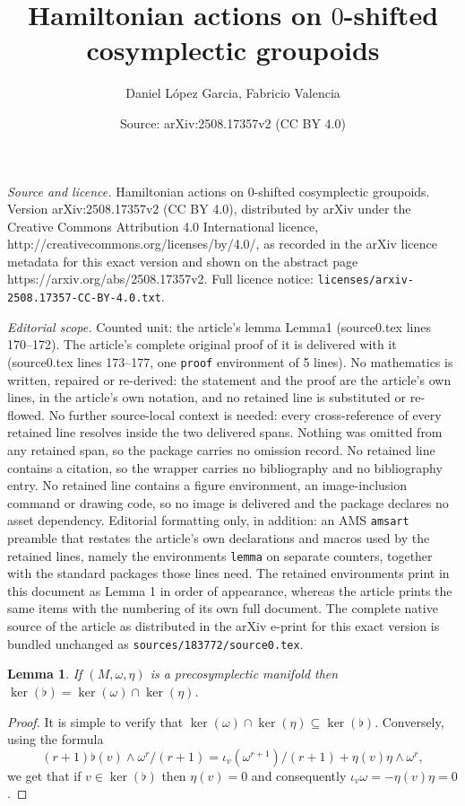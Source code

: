 \documentclass[10pt,a4paper]{amsart}
\title{Hamiltonian actions on $0$-shifted cosymplectic groupoids}
\author{Daniel L\'opez Garcia, Fabricio Valencia}
\date{Source: arXiv:2508.17357v2 (CC BY 4.0)}
\newtheorem{lemma}{Lemma}
\begin{document}
\maketitle

\noindent\emph{Source and licence.} Hamiltonian actions on $0$-shifted cosymplectic groupoids. Version arXiv:2508.17357v2 (CC BY 4.0), distributed by arXiv under the Creative Commons Attribution 4.0 International licence, http://creativecommons.org/licenses/by/4.0/, as recorded in the arXiv licence metadata for this exact version and shown on the abstract page https://arxiv.org/abs/2508.17357v2. Full licence notice: \texttt{licenses/arxiv-2508.17357-CC-BY-4.0.txt}.\par\smallskip

\noindent\textit{Editorial scope.} Counted unit: the article's lemma Lemma1 (source0.tex lines 170--172). The article's complete original proof of it is delivered with it (source0.tex lines 173--177, one \texttt{proof} environment of 5 lines). No mathematics is written, repaired or re-derived: the statement and the proof are the article's own lines, in the article's own notation, and no retained line is substituted or re-flowed.  No further source-local context is needed: every cross-reference of every retained line resolves inside the two delivered spans.  Nothing was omitted from any retained span, so the package carries no omission record.  No retained line contains a citation, so the wrapper carries no bibliography and no bibliography entry.  No retained line contains a figure environment, an image-inclusion command or drawing code, so no image is delivered and the package declares no asset dependency.  Editorial formatting only, in addition: an AMS \texttt{amsart} preamble that restates the article's own declarations and macros used by the retained lines, namely the environments \texttt{lemma} on separate counters, together with the standard packages those lines need.  The retained environments print in this document as Lemma 1 in order of appearance, whereas the article prints the same items with the numbering of its own full document.  The complete native source of the article as distributed in the arXiv e-print for this exact version is bundled unchanged as \texttt{sources/183772/source0.tex}.
\begin{lemma}\label{Lemma1}
If $(M,\omega,\eta)$ is a precosymplectic manifold then $\ker(\flat)=\ker(\omega)\cap \ker(\eta)$.
\end{lemma}

\begin{proof}
It is simple to verify that $\ker(\omega)\cap \ker(\eta) \subseteq \ker(\flat)$. Conversely, using the formula
$$(r+1)\flat(v)\wedge \omega^r/(r+1)=\iota_v(\omega^{r+1})/(r+1)+\eta(v)\eta\wedge \omega^r,$$
we get that if $v\in\ker(\flat)$ then $\eta(v)=0$ and consequently $\iota_v\omega=-\eta(v)\eta=0$.
\end{proof}
\end{document}
